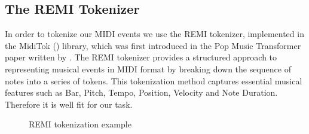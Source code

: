 \documentclass[a4paper,12pt]{extarticle}
\begin{document}
\subsection{The REMI Tokenizer}
In order to tokenize our MIDI events we use the REMI tokenizer, implemented in the MidiTok (\cite{miditok2021}) library, which was first introduced in the Pop Music Transformer paper written by \cite{huang_remi_2020}. The REMI tokenizer provides a structured approach to representing musical events in MIDI format by breaking down the sequence of notes into a series of tokens. This tokenization method captures essential musical features such as Bar, Pitch, Tempo, Position, Velocity and Note Duration. Therefore it is well fit for our task. \vspace{0.15cm}


\begin{figure}[H]
    \centering
    \caption{REMI tokenization example}
\end{figure}
\end{document}
